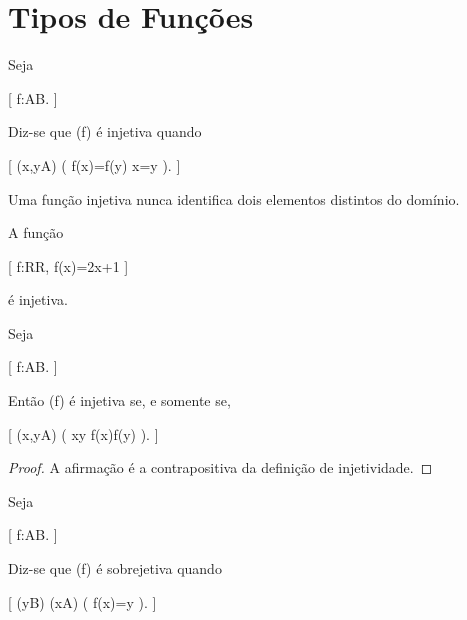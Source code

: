 \documentclass[../../main]{subfiles}
\begin{document}
\section{Tipos de Funções}
\label{sec:matematica:funcoes:tipos-de-funcoes}

\begin{defn}
	\label{def:matematica:funcoes:tipos-de-funcoes:injetiva}

	Seja

		[
			f:A\to B.
		]

	Diz-se que (f) é injetiva quando

		[
			(\forall x,y\in A)
			\bigl(
			f(x)=f(y)
			\Rightarrow
			x=y
			\bigr).
		]

\end{defn}

\begin{obs}

	Uma função injetiva nunca identifica dois elementos distintos do
	domínio.

\end{obs}

\begin{ex}

	A função

	[
	f:\mathbb R\to\mathbb R,
	\qquad
	f(x)=2x+1
	]

	é injetiva.

\end{ex}

\begin{prop}
	\label{prop:matematica:funcoes:tipos-de-funcoes:caracterizacao-injetiva}

	Seja

		[
			f:A\to B.
		]

	Então (f) é injetiva se, e somente se,

	[
			(\forall x,y\in A)
			\bigl(
			x\neq y
			\Rightarrow
			f(x)\neq f(y)
			\bigr).
		]

\end{prop}

\begin{proof}

	A afirmação é a contrapositiva da definição de injetividade.

\end{proof}

\begin{defn}
	\label{def:matematica:funcoes:tipos-de-funcoes:sobrejetiva}

	Seja

		[
			f:A\to B.
		]

	Diz-se que (f) é sobrejetiva quando

		[
			(\forall y\in B)
			(\exists x\in A)
			\bigl(
			f(x)=y
			\bigr).
		]

\end{defn}
\end{document}

